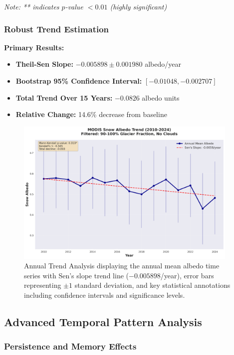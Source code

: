 \documentclass[12pt,a4paper]{article}
\newcommand{\pvalue}{$p$-value}
\begin{document}
\textit{Note: ** indicates \pvalue{} $< 0.01$ (highly significant)}

\subsubsection{Robust Trend Estimation}

\textbf{Primary Results:}
\begin{itemize}
    \item \textbf{Theil-Sen Slope:} $-0.005898 \pm 0.001980$ albedo/year
    \item \textbf{Bootstrap 95\% Confidence Interval:} $[-0.01048, -0.002707]$
    \item \textbf{Total Trend Over 15 Years:} $-0.0826$ albedo units
    \item \textbf{Relative Change:} 14.6\% decrease from baseline
\end{itemize}

\begin{figure}[H]
\centering
\includegraphics[width=0.95\textwidth]{../../results/plots/annual_trend.png}
\caption{Annual Trend Analysis displaying the annual mean albedo time series with Sen's slope trend line ($-0.005898$/year), error bars representing $\pm 1$ standard deviation, and key statistical annotations including confidence intervals and significance levels.}
\label{fig:annual_trend}
\end{figure}

\subsection{Advanced Temporal Pattern Analysis}

\subsubsection{Persistence and Memory Effects}
\end{document}
